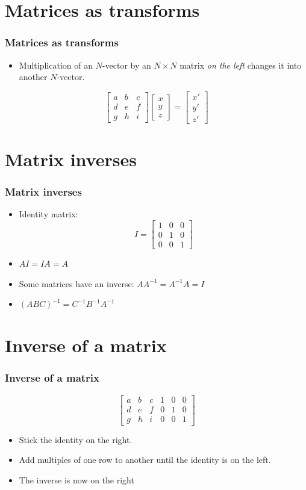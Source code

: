 \documentclass[]{beamer}
\newcommand{\sect}[1]{
\section{#1}
\begin{frame}[fragile]\frametitle{#1}
}
\begin{document}
\sect{Matrices as transforms}
\begin{itemize}
\item{Multiplication of an $N$-vector by an $N\times N$ matrix {\em on the
  left} changes it into another $N$-vector.}
\end{itemize}
\[
\left[\begin{array}{ccc}a&b&c\\d&e&f\\g&h&i\end{array}\right]
\left[\begin{array}{c}x\\y\\z\end{array}\right]
=
\left[\begin{array}{c}x'\\y'\\z'\end{array}\right]
\]
\end{frame}

\sect{Matrix inverses}
\begin{itemize}
\item Identity matrix: \[I=\left[\begin{array}{ccc}1&0&0\\0&1&0\\0&0&1\end{array}\right]\]
\item $AI = IA = A$
\item Some matrices have an inverse: $AA^{-1} = A^{-1}A = I$
\item $(ABC)^{-1} = C^{-1}B^{-1}A^{-1}$
\end{itemize}

\end{frame}


\sect{Inverse of a matrix}
\[
\left[\begin{array}{cccccc}a&b&c&1&0&0\\
d&e&f&0&1&0\\
g&h&i&0&0&1\end{array}\right]
\]
\begin{itemize}
\item Stick the identity on the right.
\item Add multiples of one row to another until the identity is on the left.
\item The inverse is now on the right
\end{itemize}
\end{frame}
\end{document}
